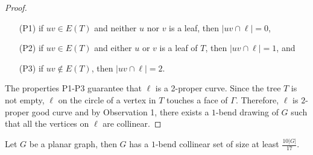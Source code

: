 \begin{proof}
    \begin{enumerate}
        \item [(P1)] if $uv \in E(T)$ and neither $u$ nor $v$ is a leaf, then $|uv \cap \ell| = 0$,

        \item [(P2)] if $uv \in E(T)$ and either $u$ or $v$ is a leaf of $T$, then $|uv \cap \ell| = 1$, and

        \item [(P3)] if $uv \notin E(T)$, then $|uv \cap \ell| = 2$.
    \end{enumerate}

    The properties P1-P3 guarantee that $\ell$ is a 2-proper curve. Since the tree $T$ is not empty, $\ell$ on the circle of a vertex in $T$ touches a face of $\Gamma$. Therefore, $\ell$ is $2$-proper good curve and by Observation 1, there exists a $1$-bend drawing of $G$ such that all the vertices on $\ell$ are collinear.


\end{proof}


\begin{thm}
    Let $G$ be a planar graph, then $G$ has a $1$-bend collinear set of size at least $\frac{10|G|}{17}$.
\end{thm}
